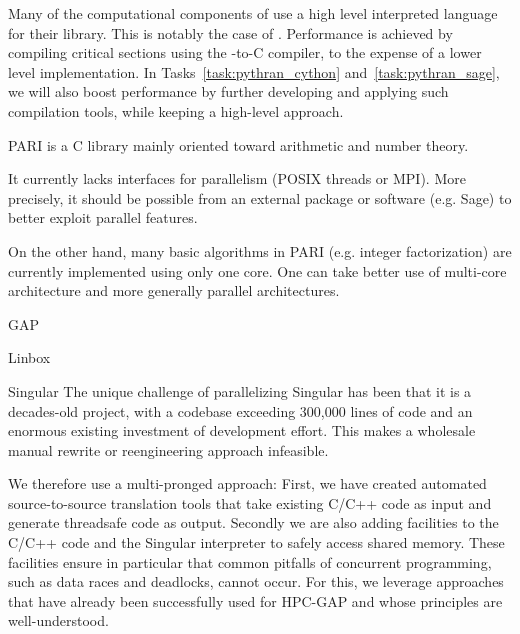 \begin{Workpackage}{\thewpno}
\begin{WPDescription}

  Many of the computational components of \TheProject use a high level
  interpreted language for their library. This is notably the case of
  \Sage. Performance is achieved by compiling critical sections using
  the \Cython \Python-to-C compiler, to the expense of a lower level
  implementation. In Tasks~\ref{task:pythran_cython}
  and~\ref{task:pythran_sage}, we will also boost performance by
  further developing and applying such compilation tools, while
  keeping a high-level approach.

\end{WPDescription}

\begin{task}{PARI}
  \label{task:hpc_pari}
  \Pari is a C library mainly oriented toward arithmetic and number theory.
  
  It currently lacks interfaces for parallelism (POSIX threads or
  MPI). More precisely, it should be possible from an external package
  or software (e.g. Sage) to better exploit \Pari parallel features.

  On the other hand, many basic algorithms in PARI (e.g. integer
  factorization) are currently implemented using only one core. One can
  take better use of multi-core architecture and more generally parallel
  architectures.
\end{task}

\begin{task}{GAP}
  \label{task:hpc_gap}

\end{task}

\begin{task}{Linbox}
  \label{task:hpc_linbox}

\end{task}

\begin{task}{Singular}
  \label{task:hpc_singular}
The unique challenge of parallelizing Singular has been that it is a decades-old project, with a codebase exceeding 300,000 lines of code and an enormous existing investment of development effort. This makes a wholesale manual rewrite or reengineering approach infeasible.

We therefore use a multi-pronged approach: First, we have created automated source-to-source translation tools that take existing C/C++ code as input and generate threadsafe code as output. Secondly we are also adding facilities to the C/C++ code and the Singular interpreter to safely access shared memory. These facilities ensure in particular that common pitfalls of concurrent programming, such as data races and deadlocks, cannot occur. For this, we leverage approaches that have already been successfully used for HPC-GAP and whose principles are well-understood.


\end{task}
\end{Workpackage}
